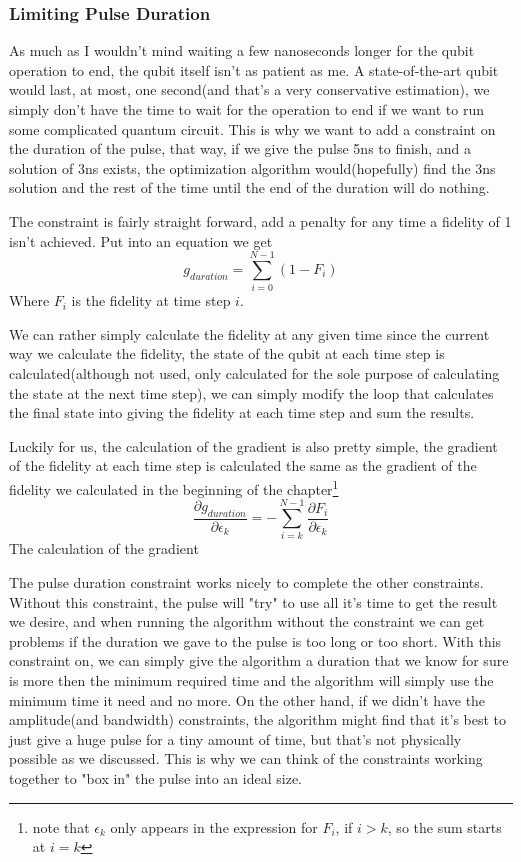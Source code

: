 \documentclass[english, a4paper, 12pt, twoside]{article}
\numberwithin{equation}{section} %
\begin{document}
\subsubsection{Limiting Pulse Duration}
As much as I wouldn't mind waiting a few nanoseconds longer for the qubit operation to end, the qubit itself isn't as patient as me. A state-of-the-art qubit would last, at most, one second(and that's a very conservative estimation), we simply don't have the time to wait for the operation to end if we want to run some complicated quantum circuit. This is why we want to add a constraint on the duration of the pulse, that way, if we give the pulse 5ns to finish, and a solution of 3ns exists, the optimization algorithm would(hopefully) find the 3ns solution and the rest of the time until the end of the duration will do nothing.

The constraint is fairly straight forward, add a penalty for any time a fidelity of 1 isn't achieved. Put into an equation we get
\[
    g_{duration} = \sum_{i = 0}^{N-1} (1 - F_i)
\]
Where $F_i$ is the fidelity at time step $i$.

We can rather simply calculate the fidelity at any given time since the current way we calculate the fidelity, the state of the qubit at each time step is calculated(although not used, only calculated for the sole purpose of calculating the state at the next time step), we can simply modify the loop that calculates the final state into giving the fidelity at each time step and sum the results. 

Luckily for us, the calculation of the gradient is also pretty simple, the gradient of the fidelity at each time step is calculated the same as the gradient of the fidelity we calculated in the beginning of the chapter\footnote{note that $\epsilon_k$ only appears in the expression for $F_i$, if $i > k$, so the sum starts at $i = k$}
\[
    \frac{\partial g_{duration}}{\partial \epsilon_k} = -\sum_{i = k}^{N-1}\frac{\partial F_i}{\partial \epsilon_k}
\]
The calculation of the gradient %

The pulse duration constraint works nicely to complete the other constraints. Without this constraint, the pulse will "try" to use all it's time to get the result we desire, and when running the algorithm without the constraint we can get problems if the duration we gave to the pulse is too long or too short. With this constraint on, we can simply give the algorithm a duration that we know for sure is more then the minimum required time and the algorithm will simply use the minimum time it need and no more. On the other hand, if we didn't have the amplitude(and bandwidth) constraints, the algorithm might find that it's best to just give a huge pulse for a tiny amount of time, but that's not physically possible as we discussed. This is why we can think of the constraints working together to "box in" the pulse into an ideal size.
\end{document}
